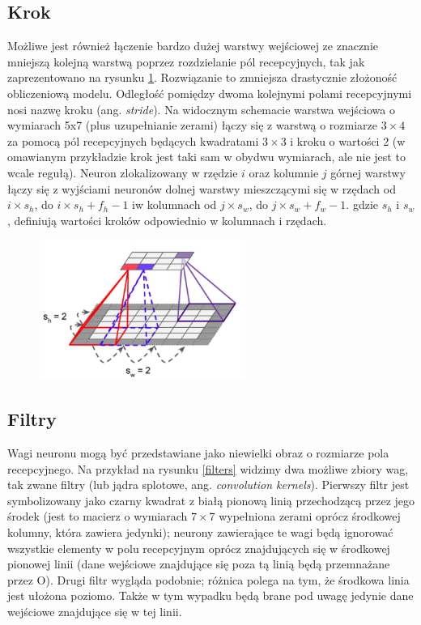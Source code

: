\documentclass{article}
\begin{document}
\subsection{Krok}
Możliwe jest również łączenie bardzo dużej warstwy wejściowej ze znacznie mniejszą kolejną warstwą poprzez rozdzielanie pól recepcyjnych, tak jak zaprezentowano na rysunku \ref{step}. Rozwiązanie to zmniejsza drastycznie złożoność obliczeniową modelu. Odległość pomiędzy dwoma kolejnymi polami recepcyjnymi nosi nazwę kroku (ang. \textit{stride}). Na widocznym schemacie warstwa wejściowa o wymiarach 5x7 (plus uzupełnianie zerami) łączy się z warstwą o rozmiarze $3 \times 4$ za pomocą pól recepcyjnych będących kwadratami $3 \times 3$ i kroku o wartości 2 (w omawianym przykładzie krok jest taki sam w obydwu wymiarach, ale nie jest to wcale regułą). Neuron zlokalizowany w rzędzie $i$ oraz kolumnie $j$ górnej warstwy łączy się z wyjściami neuronów dolnej warstwy mieszczącymi się w rzędach od $i\times s_{h}$, do $i \times s_{h}+f_{h}-1$ iw kolumnach od $j \times s_{w}$, do $j \times s_{w}+f_{w}-1$. gdzie $s_{h}$ i $s_{w}$, definiują wartości kroków odpowiednio w kolumnach i rzędach. \cite{geron}
\begin{figure}[H]
	\centering
	\includegraphics[width=0.6\textwidth,keepaspectratio=true]{step}
	\caption{}
	\label{step}
\end{figure}
\subsection{Filtry}
Wagi neuronu mogą być przedstawiane jako niewielki obraz o rozmiarze pola recepcyjnego. Na przykład na rysunku \ref{filters} widzimy dwa możliwe zbiory wag, tak zwane filtry (lub jądra splotowe, ang. \textit{convolution kernels}). Pierwszy filtr jest symbolizowany jako czarny kwadrat z białą pionową linią przechodzącą przez jego środek (jest to macierz o wymiarach $7 \times 7$ wypełniona zerami oprócz środkowej kolumny, która zawiera jedynki); neurony zawierające te wagi będą ignorować wszystkie elementy w polu recepcyjnym oprócz znajdujących się w środkowej pionowej linii (dane wejściowe znajdujące się poza tą linią będą przemnażane przez O). Drugi filtr wygląda podobnie; różnica polega na tym, że środkowa linia jest ułożona poziomo. Także w tym wypadku będą brane pod uwagę jedynie dane wejściowe znajdujące się w tej linii. \cite{geron}
\end{document}
